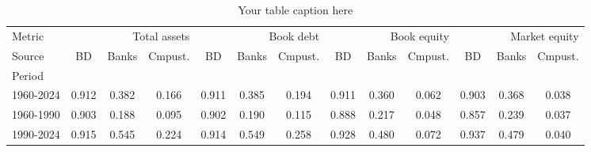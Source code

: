 
    \usepackage{booktabs} %
    \usepackage{graphicx} %
    \usepackage{adjustbox} %

    \begin{table}[htbp]
      \centering
      \caption{Your table caption here}
      \label{tab:yourlabel}
      \begin{adjustbox}{max width=\textwidth}
      \small
      \begin{tabular}{lcccccccccccc}
\toprule
Metric & \multicolumn{3}{r}{Total assets} & \multicolumn{3}{r}{Book debt} & \multicolumn{3}{r}{Book equity} & \multicolumn{3}{r}{Market equity} \\
Source & BD & Banks & Cmpust. & BD & Banks & Cmpust. & BD & Banks & Cmpust. & BD & Banks & Cmpust. \\
Period &  &  &  &  &  &  &  &  &  &  &  &  \\
\midrule
1960-2024 & 0.912 & 0.382 & 0.166 & 0.911 & 0.385 & 0.194 & 0.911 & 0.360 & 0.062 & 0.903 & 0.368 & 0.038 \\
1960-1990 & 0.903 & 0.188 & 0.095 & 0.902 & 0.190 & 0.115 & 0.888 & 0.217 & 0.048 & 0.857 & 0.239 & 0.037 \\
1990-2024 & 0.915 & 0.545 & 0.224 & 0.914 & 0.549 & 0.258 & 0.928 & 0.480 & 0.072 & 0.937 & 0.479 & 0.040 \\
\bottomrule
\end{tabular}

      \end{adjustbox}
    \end{table}
    